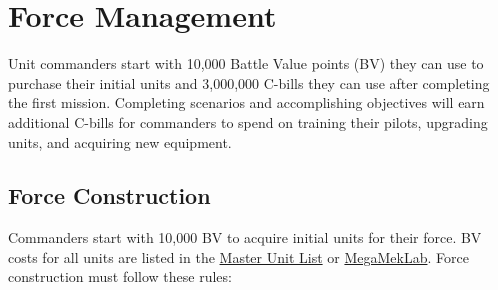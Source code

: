 \documentclass{article}
\begin{document}
\newpage

\section{Force Management}

Unit commanders start with 10,000 Battle Value points (BV) they can use to purchase their initial units and 3,000,000 C-bills they can use after completing the first mission.
Completing scenarios and accomplishing objectives will earn additional C-bills for commanders to spend on training their pilots, upgrading units, and acquiring new equipment.

\subsection{Force Construction}
\label{subsec:force_construction}

Commanders start with 10,000 BV to acquire initial units for their force.
BV costs for all units are listed in the \href{http://www.masterunitlist.info}{Master Unit List} or \href{https://megamek.org}{MegaMekLab}.
Force construction must follow these rules:
\end{document}
